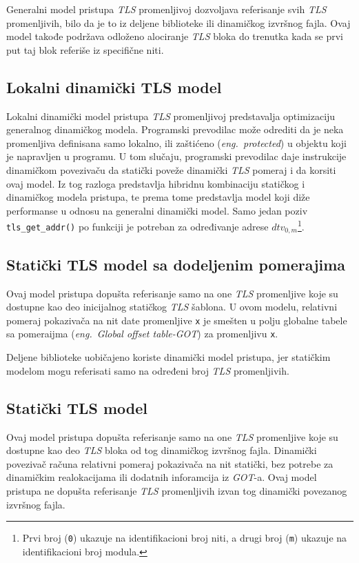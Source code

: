\documentclass[12pt,oneside]{memoir}
\begin{document}
Generalni model pristupa \emph{TLS} promenljivoj dozvoljava referisanje svih \emph{TLS} promenljivih, bilo da je to iz deljene biblioteke ili dinamičkog izvršnog fajla. Ovaj model takođe podržava odloženo alociranje \emph{TLS} bloka do trenutka kada se prvi put taj blok referiše iz specifične niti.

\subsection{Lokalni dinamički TLS model}

Lokalni dinamički model pristupa \emph{TLS} promenljivoj predstavalja optimizaciju generalnog dinamičkog modela. Programski prevodilac može odrediti da je neka promenljiva definisana samo lokalno, ili zaštićeno (\emph{eng.~protected}) u objektu koji je napravljen u programu. U tom slučaju, programski prevodilac daje instrukcije dinamičkom povezivaču da statički poveže dinamički \emph{TLS} pomeraj i da korsiti ovaj model. Iz tog razloga predstavlja hibridnu kombinaciju statičkog i dinamičkog modela pristupa, te prema tome predstavlja model koji diže performanse u odnosu na generalni dinamički model. Samo jedan poziv \texttt{tls\_get\_addr()} po funkciji je potreban za određivanje adrese \texttt{$dtv_{0,m}$}\footnote{Prvi broj (\texttt{0}) ukazuje na identifikacioni broj niti, a drugi broj (\texttt{m}) ukazuje na identifikacioni broj modula.}.

\subsection{Statički TLS model sa dodeljenim pomerajima}

Ovaj model pristupa dopušta referisanje samo na one \emph{TLS} promenljive koje su dostupne kao deo inicijalnog statičkog \emph{TLS} šablona. U ovom modelu, relativni pomeraj pokazivača na nit date promenljive \texttt{x} je smešten u polju globalne tabele sa pomeraijma (\emph{eng.~Global offset table-GOT}) za promenljivu \texttt{x}.

Deljene biblioteke uobičajeno koriste dinamički model pristupa, jer statičkim modelom mogu referisati samo na određeni broj \emph{TLS} promenljivih.

\subsection{Statički TLS model}

Ovaj model pristupa dopušta referisanje samo na one \emph{TLS} promenljive koje su dostupne kao deo \emph{TLS} bloka od tog dinamičkog izvršnog fajla. Dinamički povezivač računa relativni pomeraj pokazivača na nit statički, bez potrebe za dinamičkim realokacijama ili dodatnih inforamcija iz \emph{GOT}-a. Ovaj model pristupa ne dopušta referisanje \emph{TLS} promenljivih izvan tog dinamički povezanog izvršnog fajla.
\end{document}
